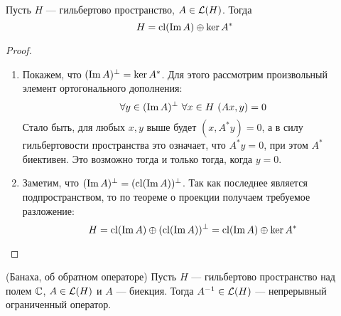 \begin{theorem} \label{conj_decomp_th}
	Пусть $H$ --- гильбертово пространство, $A \in \mathcal{L}(H)$. Тогда
	\[
		H = \operatorname{cl}(\operatorname{Im} A) \oplus \ker A^*
	\]
\end{theorem}

\begin{proof}~
	\begin{enumerate}
		\item Покажем, что $(\operatorname{Im} A)^\bot = \ker A^*$. Для этого рассмотрим произвольный элемент ортогонального дополнения:
		\[
			\forall y \in (\im A)^\bot\ \forall x \in H\ (Ax, y) = 0
		\]
		Стало быть, для любых $x, y$ выше будет $(x, A^*y) = 0$, а в силу гильбертовости пространства это означает, что $A^*y = 0$, при этом $A^*$ биективен. Это возможно тогда и только тогда, когда $y = 0$.
		
		\item Заметим, что $(\operatorname{Im} A)^\bot = (\operatorname{cl}(\operatorname{Im} A))^\bot$. Так как последнее является подпространством, то по теореме о проекции получаем требуемое разложение:
		\[
			H = \operatorname{cl}(\operatorname{Im} A) \oplus (\operatorname{cl}(\operatorname{Im} A))^\bot = \operatorname{cl}(\operatorname{Im} A) \oplus \ker A^*
		\]
	\end{enumerate}
\end{proof}

\begin{theorem} (Банаха, об обратном операторе)
	Пусть $H$ --- гильбертово пространство над полем $\mathbb{C}$, $A \in \mathcal{L}(H)$ и $A$ --- биекция. Тогда $A^{-1} \in \mathcal{L}(H)$ --- непрерывный ограниченный оператор.
\end{theorem}

